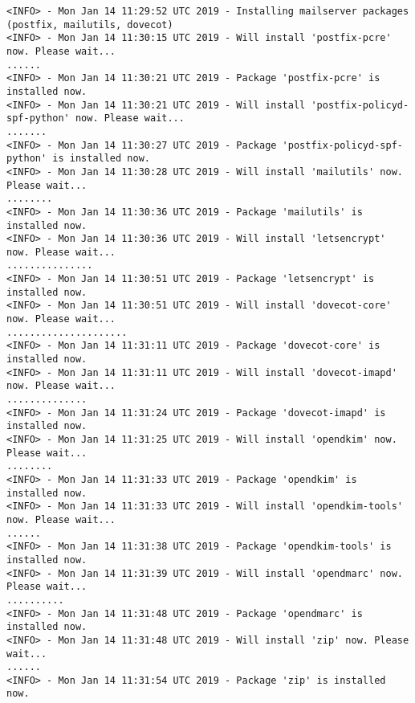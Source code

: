 \begin{lstlisting}[escapeinside=||]
<INFO> - Mon Jan 14 11:29:52 UTC 2019 - Installing mailserver packages (postfix, mailutils, dovecot)
<INFO> - Mon Jan 14 11:30:15 UTC 2019 - Will install 'postfix-pcre' now. Please wait...
......
<INFO> - Mon Jan 14 11:30:21 UTC 2019 - Package 'postfix-pcre' is installed now.     
<INFO> - Mon Jan 14 11:30:21 UTC 2019 - Will install 'postfix-policyd-spf-python' now. Please wait...
.......
<INFO> - Mon Jan 14 11:30:27 UTC 2019 - Package 'postfix-policyd-spf-python' is installed now.
<INFO> - Mon Jan 14 11:30:28 UTC 2019 - Will install 'mailutils' now. Please wait...
........
<INFO> - Mon Jan 14 11:30:36 UTC 2019 - Package 'mailutils' is installed now.
<INFO> - Mon Jan 14 11:30:36 UTC 2019 - Will install 'letsencrypt' now. Please wait...
...............
<INFO> - Mon Jan 14 11:30:51 UTC 2019 - Package 'letsencrypt' is installed now.
<INFO> - Mon Jan 14 11:30:51 UTC 2019 - Will install 'dovecot-core' now. Please wait...
.....................
<INFO> - Mon Jan 14 11:31:11 UTC 2019 - Package 'dovecot-core' is installed now.
<INFO> - Mon Jan 14 11:31:11 UTC 2019 - Will install 'dovecot-imapd' now. Please wait...
..............
<INFO> - Mon Jan 14 11:31:24 UTC 2019 - Package 'dovecot-imapd' is installed now.
<INFO> - Mon Jan 14 11:31:25 UTC 2019 - Will install 'opendkim' now. Please wait...
........
<INFO> - Mon Jan 14 11:31:33 UTC 2019 - Package 'opendkim' is installed now.
<INFO> - Mon Jan 14 11:31:33 UTC 2019 - Will install 'opendkim-tools' now. Please wait...
......
<INFO> - Mon Jan 14 11:31:38 UTC 2019 - Package 'opendkim-tools' is installed now.
<INFO> - Mon Jan 14 11:31:39 UTC 2019 - Will install 'opendmarc' now. Please wait...
..........
<INFO> - Mon Jan 14 11:31:48 UTC 2019 - Package 'opendmarc' is installed now.
<INFO> - Mon Jan 14 11:31:48 UTC 2019 - Will install 'zip' now. Please wait...
......
<INFO> - Mon Jan 14 11:31:54 UTC 2019 - Package 'zip' is installed now.
 \end{lstlisting}
 
